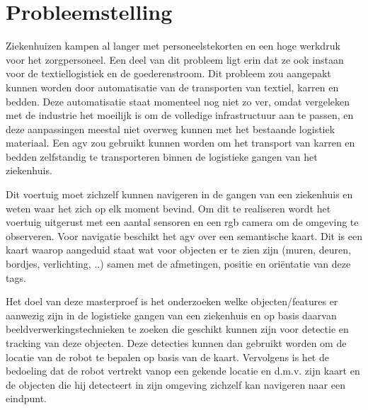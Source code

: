 
\chapter{Probleemstelling}

Ziekenhuizen kampen al langer met personeelstekorten en een hoge werkdruk voor het zorgpersoneel. Een deel van dit probleem ligt erin dat ze ook instaan voor de textiellogistiek en de goederenstroom.
Dit probleem zou aangepakt kunnen worden door automatisatie van de transporten van textiel, karren en bedden. Deze automatisatie staat momenteel nog niet zo ver, omdat vergeleken met de industrie het moeilijk is om de volledige
infrastructuur aan te passen, en deze aanpassingen meestal niet overweg kunnen met het bestaande logistiek materiaal. Een \gls{agv} zou gebruikt kunnen worden om het transport van karren en bedden zelfstandig te transporteren binnen de logistieke gangen van het ziekenhuis.

Dit voertuig moet zichzelf kunnen navigeren in de gangen van een ziekenhuis en weten waar het zich op elk moment bevind. Om dit te realiseren 
wordt het voertuig uitgerust met een aantal sensoren en een \gls{rgb} camera om de omgeving te observeren. Voor navigatie beschikt het \gls{agv}
over een semantische kaart. Dit is een kaart waarop aangeduid staat wat voor objecten er te zien zijn (muren, deuren, bordjes, verlichting, ..) samen met de afmetingen, positie en ori\"{e}ntatie van deze tags.


Het doel van deze masterproef is het onderzoeken welke objecten/features er aanwezig zijn in de logistieke gangen van een ziekenhuis en op basis daarvan
beeldverwerkingstechnieken te zoeken die geschikt kunnen zijn voor detectie en tracking van deze objecten. Deze detecties kunnen dan gebruikt worden om de locatie van de robot te bepalen op basis van de kaart.
Vervolgens is het de bedoeling dat de robot vertrekt vanop een gekende locatie en d.m.v. zijn kaart en de objecten die hij detecteert in zijn omgeving zichzelf kan navigeren naar een eindpunt.